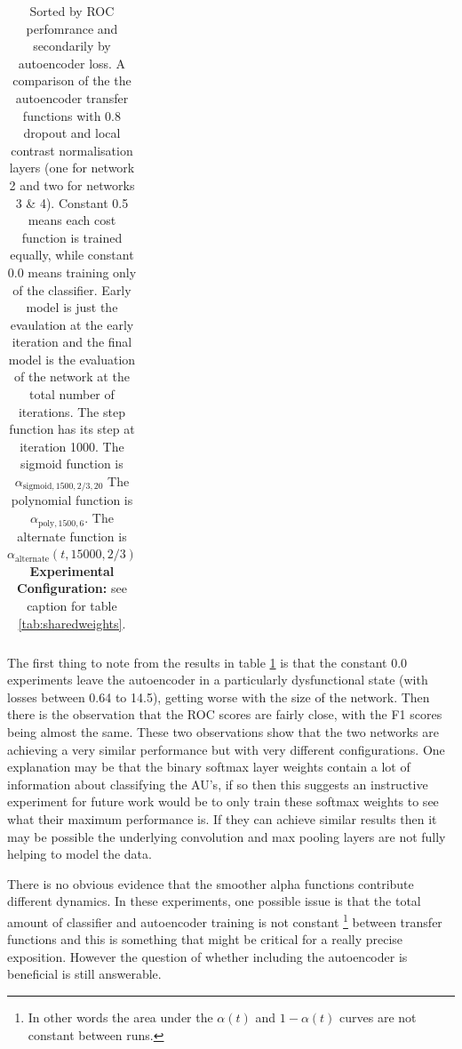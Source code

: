 \begin{table}[]
{\begin{tabular}{rrrrrrrrrrr}
      \hline
      \end{tabular}
      }
      \caption{Sorted by ROC perfomrance and secondarily by autoencoder loss.
      A comparison of the the autoencoder transfer functions with 0.8 dropout and local contrast normalisation layers (one for network 2 and two for networks 3 \& 4).
      Constant 0.5 means each cost function is trained equally, while constant 0.0 means training only of the classifier.
      Early model is just the evaulation at the early iteration and the final model is the evaluation of the network at the total number of iterations.
      The step function has its step at iteration 1000.
      The sigmoid function is $\alpha_{\text{sigmoid},1500,2/3,20}$
      The polynomial function is $\alpha_{\text{poly},1500,6}$.
      The alternate function is $\alpha_{\text{alternate}}(t,15000,2/3)$
      {\bf Experimental Configuration:} see caption for table \ref{tab:sharedweights}.} \label{tab:auto_final_1}
    \end{table}

      The first thing to note from the results in table \ref{tab:auto_final_1} is that
      the constant 0.0 experiments leave the autoencoder in a particularly dysfunctional state (with losses between 0.64 to 14.5),
      getting worse with the size of the network. Then there is the observation that
      the ROC scores are fairly close, with the F1 scores being almost the same. These two
      observations show that the two networks are achieving a very similar performance but
      with very different configurations. One explanation may be that the binary softmax layer weights
      contain a lot of information about classifying the AU's, if so then this suggests an
      instructive experiment for future work would be to only train these softmax weights to see
      what their maximum performance is. If they can achieve similar results then it may be possible
      the underlying convolution and max pooling layers are not fully helping to model the data.

      There is no obvious evidence that the smoother alpha functions contribute different
      dynamics. In these experiments, one possible issue is that
      the total amount of classifier and autoencoder training is not constant
      \footnote{In other words the area under the $\alpha(t)$ and $1-\alpha(t)$ curves are not constant between runs.}
      between transfer functions
      and this is something that might be critical for a really precise exposition. However the question of whether
      including the autoencoder is beneficial is still answerable.

